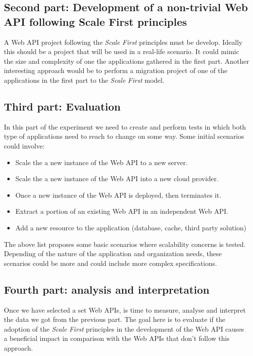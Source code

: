 \documentclass[10pt,article]{IEEEtran}
\begin{document}
\subsection{Second part: Development of a non-trivial Web API following Scale First principles}
A Web API project following the \textit{Scale First} principles must be develop. Ideally this should be a project that will be used in a real-life scenario. It could mimic the size and complexity of one the applications gathered in the first part. Another interesting approach would be to perform a migration project of one of the applications in the first part to the \textit{Scale First} model.

\subsection{Third part: Evaluation}
In this part of the experiment we need to create and perform tests in which both type of applications need to reach to change on some way. Some initial scenarios could involve:

\begin{itemize}
    \item
    Scale the a new instance of the Web API to a new server.
    \item
    Scale the a new instance of the Web API into a new cloud provider.
    \item
    Once a new instance of the Web API is deployed, then terminates it.
    \item
    Extract a portion of an existing Web API in an independent Web API.
    \item
    Add a new resource to the application (database, cache, third party solution)
\end{itemize}

The above list proposes some basic scenarios where scalability concerns is tested. Depending of the nature of the application and organization needs, these scenarios could be more and could include more complex specifications.

\subsection{Fourth part: analysis and interpretation}
Once we have selected a set Web APIs, is time to measure, analyse and interpret the data we got from the previous part. The goal here is to evaluate if the adoption of the \textit{Scale First} principles in the development of the Web API causes a beneficial impact in comparison with the Web APIs that don't follow this approach.
\end{document}
